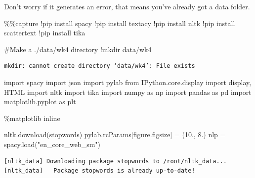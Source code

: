 \documentclass[
  letterpaper,
  DIV=11,
  numbers=noendperiod]{scrreprt}
\newenvironment{Shaded}{\begin{snugshade}}{\end{snugshade}}
\newcommand{\CommentTok}[1]{\textcolor[rgb]{0.37,0.37,0.37}{#1}}
\newcommand{\FloatTok}[1]{\textcolor[rgb]{0.68,0.00,0.00}{#1}}
\newcommand{\ImportTok}[1]{\textcolor[rgb]{0.00,0.46,0.62}{#1}}
\newcommand{\NormalTok}[1]{\textcolor[rgb]{0.00,0.23,0.31}{#1}}
\newcommand{\OperatorTok}[1]{\textcolor[rgb]{0.37,0.37,0.37}{#1}}
\newcommand{\StringTok}[1]{\textcolor[rgb]{0.13,0.47,0.30}{#1}}
\begin{document}
Don't worry if it generates an error, that means you've already got a
data folder.

\begin{Shaded}
\begin{Highlighting}[]
\OperatorTok{\%\%}\NormalTok{capture}
\OperatorTok{!}\NormalTok{pip install spacy}
\OperatorTok{!}\NormalTok{pip install textacy}
\OperatorTok{!}\NormalTok{pip install nltk}
\OperatorTok{!}\NormalTok{pip install scattertext}
\OperatorTok{!}\NormalTok{pip install tika}
\end{Highlighting}
\end{Shaded}

\begin{Shaded}
\begin{Highlighting}[]
\CommentTok{\#Make a ./data/wk4 directory}
\OperatorTok{!}\NormalTok{mkdir data}\OperatorTok{/}\NormalTok{wk4}

\end{Highlighting}
\end{Shaded}

\begin{verbatim}
mkdir: cannot create directory ‘data/wk4’: File exists
\end{verbatim}

\begin{Shaded}
\begin{Highlighting}[]
\ImportTok{import}\NormalTok{ spacy}
\ImportTok{import}\NormalTok{ json}
\ImportTok{import}\NormalTok{ pylab}
\ImportTok{from}\NormalTok{ IPython.core.display }\ImportTok{import}\NormalTok{ display, HTML}
\ImportTok{import}\NormalTok{ nltk}
\ImportTok{import}\NormalTok{ tika }
\ImportTok{import}\NormalTok{ numpy }\ImportTok{as}\NormalTok{ np}
\ImportTok{import}\NormalTok{ pandas }\ImportTok{as}\NormalTok{ pd}
\ImportTok{import}\NormalTok{ matplotlib.pyplot }\ImportTok{as}\NormalTok{ plt}

\OperatorTok{\%}\NormalTok{matplotlib inline}

\NormalTok{nltk.download(}\StringTok{\textquotesingle{}stopwords\textquotesingle{}}\NormalTok{)}
\NormalTok{pylab.rcParams[}\StringTok{\textquotesingle{}figure.figsize\textquotesingle{}}\NormalTok{] }\OperatorTok{=}\NormalTok{ (}\FloatTok{10.}\NormalTok{, }\FloatTok{8.}\NormalTok{)}
\NormalTok{nlp }\OperatorTok{=}\NormalTok{ spacy.load(}\StringTok{"en\_core\_web\_sm"}\NormalTok{)}
\end{Highlighting}
\end{Shaded}

\begin{verbatim}
[nltk_data] Downloading package stopwords to /root/nltk_data...
[nltk_data]   Package stopwords is already up-to-date!
\end{verbatim}
\end{document}
